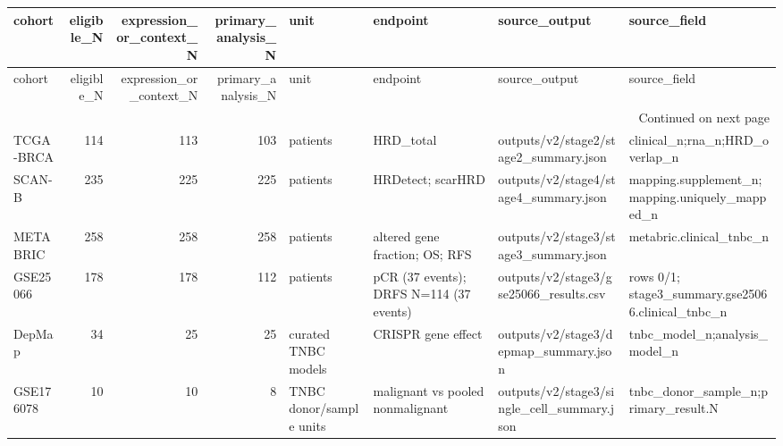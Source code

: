 \begin{longtable}{lrrrllll}
\toprule
cohort & eligible\_N & expression\_or\_context\_N & primary\_analysis\_N & unit & endpoint & source\_output & source\_field \\
\midrule
\endfirsthead
\toprule
cohort & eligible\_N & expression\_or\_context\_N & primary\_analysis\_N & unit & endpoint & source\_output & source\_field \\
\midrule
\endhead
\midrule
\multicolumn{8}{r}{Continued on next page} \\
\midrule
\endfoot
\bottomrule
\endlastfoot
TCGA-BRCA & 114 & 113 & 103 & patients & HRD\_total & outputs/v2/stage2/stage2\_summary.json & clinical\_n;rna\_n;HRD\_overlap\_n \\
SCAN-B & 235 & 225 & 225 & patients & HRDetect; scarHRD & outputs/v2/stage4/stage4\_summary.json & mapping.supplement\_n;mapping.uniquely\_mapped\_n \\
METABRIC & 258 & 258 & 258 & patients & altered gene fraction; OS; RFS & outputs/v2/stage3/stage3\_summary.json & metabric.clinical\_tnbc\_n \\
GSE25066 & 178 & 178 & 112 & patients & pCR (37 events); DRFS N=114 (37 events) & outputs/v2/stage3/gse25066\_results.csv & rows 0/1; stage3\_summary.gse25066.clinical\_tnbc\_n \\
DepMap & 34 & 25 & 25 & curated TNBC models & CRISPR gene effect & outputs/v2/stage3/depmap\_summary.json & tnbc\_model\_n;analysis\_model\_n \\
GSE176078 & 10 & 10 & 8 & TNBC donor/sample units & malignant vs pooled nonmalignant & outputs/v2/stage3/single\_cell\_summary.json & tnbc\_donor\_sample\_n;primary\_result.N \\
\end{longtable}
